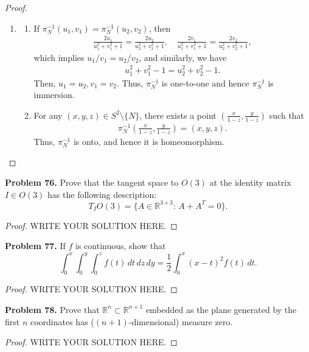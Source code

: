 \documentclass[11pt]{article}
\theoremstyle{definition}
\theoremstyle{definition}
\begin{document}
\begin{proof}
\begin{enumerate}[label=(\alph*)]
    \item \begin{enumerate}[label=\arabic*)]
        \item If $\pi^{-1}_N(u_1,v_1) = \pi^{-1}_N(u_2, v_2)$, then
        \begin{align*}
            \frac{2u_1}{u_1^2+v_1^2+1} = \frac{2u_2}{u_2^2+v_2^2+1},\quad \frac{2v_1}{u_1^2+v_1^2+1} = \frac{2v_2}{u_2^2+v_2^2+1},
        \end{align*}
        which implies $u_1/v_1 = u_2/v_2$, and similarly, we have
        \begin{align*}
            u_1^2+v_1^2-1 = u_2^2+v_2^2-1.
        \end{align*}
        Then, $u_1 = u_2, v_1 = v_2$. Thus, $\pi^{-1}_N$ is one-to-one and hence $\pi^{-1}_N$ is immersion.
        
        \item For any $(x,y,z) \in S^2 \setminus \{N\}$, there exists a point $\left(\frac{x}{1-z}, \frac{y}{1-z}\right)$ such that 
        \begin{align*}
            \pi^{-1}_N \left(\frac{x}{1-z}, \frac{y}{1-z}\right) = (x,y,z).
        \end{align*}
        Thus, $\pi^{-1}_N$ is onto, and hence it is homeomorphism.
    \end{enumerate}
\end{enumerate}
\end{proof}


\medskip

\noindent
{\bf Problem 76.}
Prove that the tangent space to $O(3)$ at the identity matrix $I\in O(3)$
has the following description:
$$
T_I O(3)=\{A\in \mathbb{R}^{3\times 3}:\, A+A^T=0\}.
$$
\begin{proof}
	WRITE YOUR SOLUTION HERE.
\end{proof}


\medskip


\noindent
{\bf Problem 77.}
If $f$ is continuous, show that
$$
\int_0^x\int_0^y\int_0^z f(t)\, dt\, dz\, dy =
\frac{1}{2}\int_0^x (x-t)^2f(t)\, dt.
$$

\begin{proof}
WRITE YOUR SOLUTION HERE.
\end{proof}


\medskip

\noindent
{\bf Problem 78.}
 Prove that $\mathbb{R}^n\subset\mathbb{R}^{n+1}$ embedded as the plane generated by the
first $n$ coordinates has ($(n+1)$-dimensional) measure zero.
\begin{proof}
	WRITE YOUR SOLUTION HERE.
\end{proof}
\end{document}
